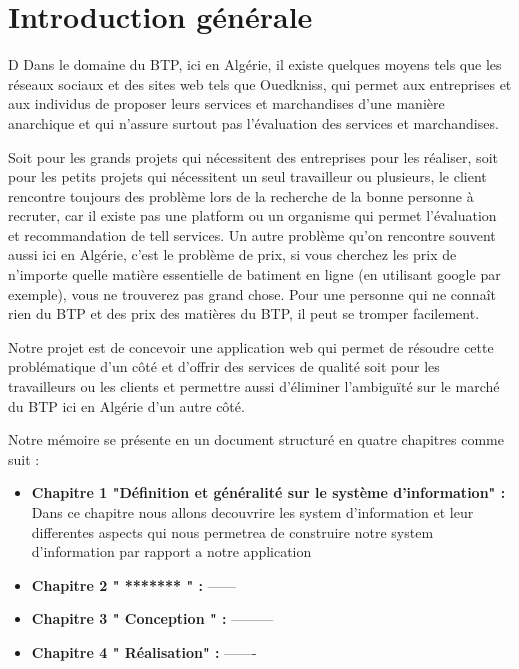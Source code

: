 \chapter*{Introduction générale}
D
Dans le domaine du BTP, ici en Algérie, il existe quelques moyens tels que les réseaux sociaux et des sites web tels que Ouedkniss, qui permet aux entreprises et aux individus de proposer leurs services et marchandises d’une manière anarchique et qui n’assure surtout pas l'évaluation des services et marchandises.
\\

\par Soit pour les grands projets qui nécessitent des entreprises pour les réaliser, soit pour les petits projets qui nécessitent un seul travailleur ou plusieurs, le client rencontre toujours des problème lors de la recherche de la bonne personne à recruter, car il existe pas une platform ou un organisme qui permet l’évaluation et recommandation de tell services. Un autre problème qu’on rencontre souvent aussi ici en Algérie, c’est le problème de prix, si vous cherchez les prix de n'importe quelle matière essentielle de batiment en ligne (en utilisant google par exemple), vous ne trouverez pas grand chose. Pour une personne qui ne connaît rien du BTP et des prix des matières du BTP, il peut se tromper facilement.\\

\par Notre projet est de concevoir une application web qui permet de résoudre cette problématique d’un côté et d'offrir des services de qualité soit pour les travailleurs ou les clients et permettre aussi d'éliminer l'ambiguïté sur le marché du BTP  ici en Algérie d’un autre côté.\\
\newpage
\vspace{0.5cm}
\par Notre mémoire se présente en un document structuré en quatre chapitres comme suit : 

\begin{itemize}[label=\textbullet]
\item \textbf{Chapitre 1 "Définition et généralité sur le système d'information" : } Dans ce chapitre nous allons decouvrire les system d’information et leur differentes aspects qui nous permetrea de construire notre system d’information par rapport a notre application \\

\item \textbf{Chapitre 2 " ******* " : } ------\\

\item \textbf{Chapitre 3 " Conception " :} ---------\\  

\item \textbf{Chapitre 4 " Réalisation" : }-------
\end{itemize}

